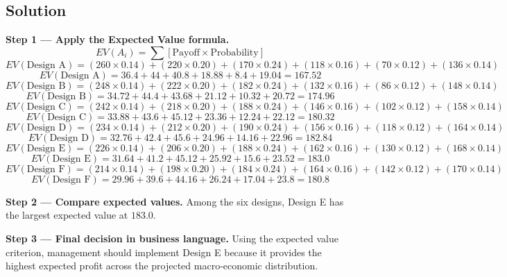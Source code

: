 \begin{ExamProblems}
		\subsection*{Solution}
		\textbf{Step 1 --- Apply the Expected Value formula.}
		\[
		EV(A_i)=\sum [\text{Payoff}\times\text{Probability}]
		\]
		\[
		EV(\text{Design A})=(260\times0.14)+(220\times0.20)+(170\times0.24)+(118\times0.16)+(70\times0.12)+(136\times0.14)
		\]
		\[
		EV(\text{Design A})=36.4+44+40.8+18.88+8.4+19.04=167.52
		\]
		\[
		EV(\text{Design B})=(248\times0.14)+(222\times0.20)+(182\times0.24)+(132\times0.16)+(86\times0.12)+(148\times0.14)
		\]
		\[
		EV(\text{Design B})=34.72+44.4+43.68+21.12+10.32+20.72=174.96
		\]
		\[
		EV(\text{Design C})=(242\times0.14)+(218\times0.20)+(188\times0.24)+(146\times0.16)+(102\times0.12)+(158\times0.14)
		\]
		\[
		EV(\text{Design C})=33.88+43.6+45.12+23.36+12.24+22.12=180.32
		\]
		\[
		EV(\text{Design D})=(234\times0.14)+(212\times0.20)+(190\times0.24)+(156\times0.16)+(118\times0.12)+(164\times0.14)
		\]
		\[
		EV(\text{Design D})=32.76+42.4+45.6+24.96+14.16+22.96=182.84
		\]
		\[
		EV(\text{Design E})=(226\times0.14)+(206\times0.20)+(188\times0.24)+(162\times0.16)+(130\times0.12)+(168\times0.14)
		\]
		\[
		EV(\text{Design E})=31.64+41.2+45.12+25.92+15.6+23.52=183.0
		\]
		\[
		EV(\text{Design F})=(214\times0.14)+(198\times0.20)+(184\times0.24)+(164\times0.16)+(142\times0.12)+(170\times0.14)
		\]
		\[
		EV(\text{Design F})=29.96+39.6+44.16+26.24+17.04+23.8=180.8
		\]
		
		\textbf{Step 2 --- Compare expected values.}
		Among the six designs, Design E has the largest expected value at $183.0$.
		
		\textbf{Step 3 --- Final decision in business language.}
		Using the expected value criterion, management should implement Design E because it provides the highest expected profit across the projected macro-economic distribution.
	\end{ExamProblems}

